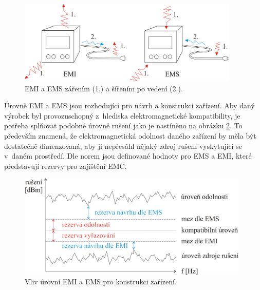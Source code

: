 \begin{figure}[!h]
	\centering
	\includegraphics[width=10.5cm]{emc_emi_ems.png}
	\caption{EMI a EMS zářením (1.) a šířením po vedení (2.).}
	\label{obr:emc_emi_ems}
\end{figure}

Úrovně EMI a EMS jsou rozhodující pro návrh a konstrukci zařízení. Aby daný výrobek byl provozuschopný z~hlediska elektromagnetické kompatibility, je potřeba splňovat podobné úrovně rušení jako je nastíněno na obrázku \ref{obr:emc_meze}. To především znamená, že elektromagnetická odolnost daného zařízení by měla být dostatečně dimenzovaná, aby ji nepřesáhl nějaký zdroj rušení vyskytující se v~daném prostředí. Dle norem jsou definované hodnoty pro EMS a EMI, které představují rezervy pro zajištění EMC.
\begin{figure}[!h]
	\centering
	\includegraphics[width=11cm]{emc_meze.png}
	\caption{Vliv úrovní EMI a EMS pro konstrukci zařízení.}
	\label{obr:emc_meze}
\end{figure}

